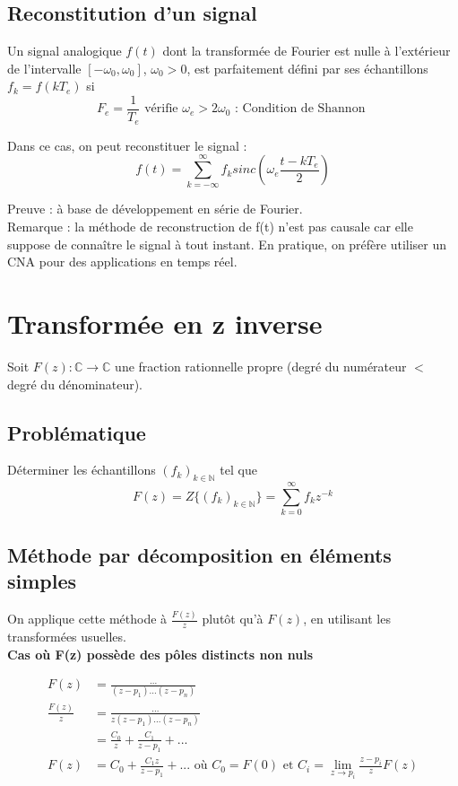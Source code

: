 \documentclass[main.tex]{subfiles}
\begin{document}
\subsection*{Reconstitution d'un signal}
\begin{thm}
Un signal analogique $f(t)$ dont la transformée de Fourier est nulle à l'extérieur de l'intervalle $[-\omega_0,\omega_0]$, $\omega_0>0$, est parfaitement défini par ses échantillons $f_k=f(kT_e)$ si
\[F_e=\frac{1}{T_e} \text{ vérifie } \omega_e > 2 \omega_0 \text{ : Condition de Shannon } \]

Dans ce cas, on peut reconstituer le signal :
\[ f(t)=\sum_{k=-\infty}^{\infty}f_k sinc(\omega_e\frac{t-kT_e}{2}) \]
\end{thm}

Preuve : à base de développement en série de Fourier.\\

\noindent Remarque : la méthode de reconstruction de f(t) n'est pas causale car elle suppose de connaître le signal à tout instant.
En pratique, on préfère utiliser un CNA pour des applications en temps réel.

\section{Transformée en z inverse}

Soit $F(z) : \mathbb{C} \rightarrow \mathbb{C}$ une fraction rationnelle propre (degré du numérateur $<$ degré du dénominateur).

\subsection*{Problématique} Déterminer les échantillons $(f_k)_{k\in\mathbb{N}}$ tel que \[F(z) = Z\{(f_k)_{k\in\mathbb{N}}\}= \sum_{k=0}^{\infty}f_kz^{-k}\]

\subsection{Méthode par décomposition en éléments simples}

On applique cette méthode à $\frac{F(z)}{z}$ plutôt qu'à $F(z)$, en utilisant les transformées usuelles.\\

\noindent \textbf{Cas où F(z) possède des pôles distincts non nuls}

\begin{align*}
F(z) & = \frac{...}{(z-p_1)...(z-p_ n)} \\
\frac{F(z)}{z} & = \frac{...}{z(z-p_1)...(z-p_n)} \\
& = \frac{C_0}{z} + \frac{C_1}{z-p_1} + ... \\
F(z) & = C_0 + \frac{C_1 z}{z-p_1} + ... \text{ où } C_0 = F(0) \text{ et } C_i = \lim_{z\rightarrow p_i} \frac{z-p_i}{z}F(z)
\end{align*}
\end{document}
